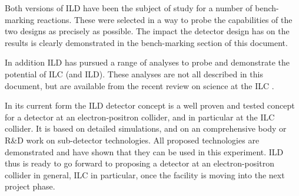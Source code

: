 Both versions of ILD have been the subject of study for a number of bench-marking reactions. These were selected in a way to probe the capabilities of the two designs as precisely as possible. The impact the detector design has on the results is clearly demonstrated in the bench-marking section of this document. 

In addition ILD has pursued a range of analyses to probe and demonstrate the potential of ILC (and ILD). These analyses are not all described in this document, but are available from the recent review on science at the ILC \cite{ild:bib:ref-keisuke}.

In its current form the ILD detector concept is a well proven and tested concept for a detector at an electron-positron collider, and in particular at the ILC collider. It is based on detailed simulations, and on an comprehensive body or R\&D work on sub-detector technologies. All proposed technologies are demonstrated and have shown that they can be used in this experiment. ILD thus is ready to go forward to proposing a detector at an electron-positron collider in general, ILC in particular, once the facility is moving into the next project phase. 






